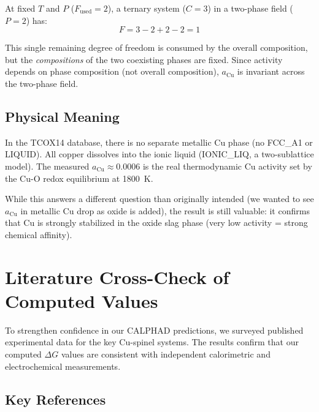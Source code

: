 \documentclass[11pt]{article}
\begin{document}
At fixed $T$ and $P$ ($F_{\text{used}} = 2$), a ternary system ($C = 3$) in a two-phase field ($P = 2$) has:
\begin{equation}
    F = 3 - 2 + 2 - 2 = 1
\end{equation}

This single remaining degree of freedom is consumed by the overall composition, but the \textit{compositions} of the two coexisting phases are fixed. Since activity depends on phase composition (not overall composition), $a_{\text{Cu}}$ is invariant across the two-phase field.

\subsection{Physical Meaning}

In the TCOX14 database, there is no separate metallic Cu phase (no FCC\_A1 or LIQUID). All copper dissolves into the ionic liquid (IONIC\_LIQ, a two-sublattice model). The measured $a_{\text{Cu}} \approx 0.0006$ is the real thermodynamic Cu activity set by the Cu-O redox equilibrium at \SI{1800}{\kelvin}.

While this answers a different question than originally intended (we wanted to see $a_{\text{Cu}}$ in metallic Cu drop as oxide is added), the result is still valuable: it confirms that Cu is strongly stabilized in the oxide slag phase (very low activity = strong chemical affinity).

\section{Literature Cross-Check of Computed Values}

To strengthen confidence in our CALPHAD predictions, we surveyed published experimental data for the key Cu-spinel systems. The results confirm that our computed $\Delta G$ values are consistent with independent calorimetric and electrochemical measurements.

\subsection{Key References}
\end{document}
